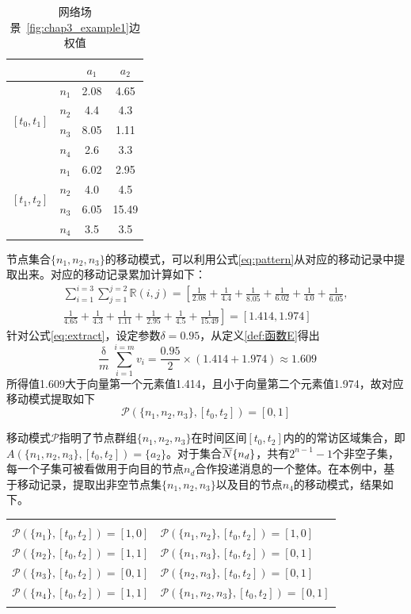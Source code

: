 \begin{table}[hbt]
\centering
  \caption{网络场景\figurename~\ref{fig:chap3_example1}边权值}
  \begin{tabular}{|c|c|cc|}
  \hline
    & & $a_1$ & $a_2$  \\
    \hline
    
    \multicolumn{1}{|c|}{\multirow{4}{*}{$[t_0,t_1]$}} & $n_1$ &2.08 & 4.65 \\
    & $n_2$ & 4.4 & 4.3 \\
    & $n_3$ & 8.05 & 1.11 \\
    & $n_4$ & 2.6 & 3.3 \\
    \hline

    \multicolumn{1}{|c|}{\multirow{4}{*}{$[t_1,t_2]$}} & $n_1$ &6.02 & 2.95 \\
    & $n_2$ & 4.0 & 4.5 \\
    & $n_3$ & 6.05 & 15.49 \\
    & $n_4$ & 3.5 & 3.5 \\
    \hline
  \end{tabular}
  \label{tab:chap3_example1}
\end{table}
节点集合$\{n_1,n_2,n_3\}$的移动模式，可以利用公式\ref{eq:pattern}从对应的移动记录中提取出来。对应的移动记录累加计算如下：
\begin{multline*}
\sum_{i=1}^{i=3}\sum_{j=1}^{j=2}\mathbb{R}(i,j) = \left[\frac{1}{2.08}+\frac{1}{4.4}+\frac{1}{8.05}+\frac{1}{6.02}+\frac{1}{4.0}+\frac{1}{6.05},\right.\\
\left.\frac{1}{4.65}+\frac{1}{4.3}+\frac{1}{1.11}+\frac{1}{2.95}+\frac{1}{4.5}+\frac{1}{15.49}\right]= [1.414,1.974]
\end{multline*}
针对公式\ref{eq:extract}，设定参数$\delta=0.95$，从定义\ref{def:函数E}得出
\[
\frac{\updelta}{m}\sum_{i=1}^{i=m}v_i=\frac{0.95}{2}\times(1.414+1.974)\approx 1.609
\] 
所得值1.609大于向量第一个元素值1.414，且小于向量第二个元素值1.974，故对应移动模式提取如下
\[
\mathcal{P}(\{n_1,n_2,n_3\},[t_0,t_2])=[0,1] 
\]

移动模式$\mathcal{P}$指明了节点群组$\{n_1,n_2,n_3\}$在时间区间$[t_0,t_2]$内的的常访区域集合，即$A(\{n_1,n_2,n_3\},[t_0,t_2])=\{a_2\}$。对于集合$\overline{N}\\\{n_d\}$，共有$2^{n-1}-1$个非空子集，每一个子集可被看做用于向目的节点$n_d$合作投递消息的一个整体。在本例中，基于移动记录，提取出非空节点集$\{n_1,n_2,n_3\}$以及目的节点$n_4$的移动模式，结果如下。

\begin{tabular}{ll}
 & \\
$\mathcal{P}(\{n_1\},[t_0,t_2])=[1,0]$ & $\mathcal{P}(\{n_1,n_2\},[t_0,t_2])=[1,0]$ \\
$\mathcal{P}(\{n_2\},[t_0,t_2])=[1,1]$ & $\mathcal{P}(\{n_1,n_3\},[t_0,t_2])=[0,1]$ \\
$\mathcal{P}(\{n_3\},[t_0,t_2])=[0,1]$ & $\mathcal{P}(\{n_2,n_3\},[t_0,t_2])=[0,1]$ \\
$\mathcal{P}(\{n_4\},[t_0,t_2])=[1,1]$ & $\mathcal{P}(\{n_1,n_2,n_3\},[t_0,t_2])=[0,1]$ \\
 &
\end{tabular}

